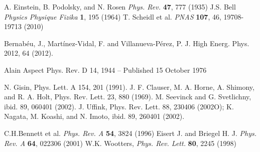 \begin{thebibliography}{}

 A. Einstein, B. Podolsky, and N. Rosen \textit{Phys. Rev.} \textbf{47}, 777 (1935)
 J.S. Bell \textit{Physics Physique Fizika} \textbf{1}, 195 (1964)
 T. Scheidl et al. \textit{PNAS} \textbf{107}, 46, 19708-19713 (2010)

 Bernabéu, J., Martínez-Vidal, F. and Villanueva-Pérez, P. J. High Energ. Phys. 2012, 64 (2012).

 Alain Aspect Phys. Rev. D 14, 1944 – Published 15 October 1976

 N. Gisin, Phys. Lett. A 154, 201 (1991).
 J. F. Clauser, M. A. Horne, A. Shimony, and R. A. Holt, Phys. Rev. Lett. 23, 880 (1969).
 M. Seevinck and G. Svetlichny, ibid. 89, 060401 (2002).
  J. Uffink, Phys. Rev. Lett. 88, 230406 (2002O); K. Nagata, M. Koashi, and N. Imoto, ibid. 89, 260401 (2002).
%

 C.H.Bennett et al. \textit{Phys. Rev. A} \textbf{54}, 3824 (1996)
 Eisert J. and Briegel H. J. \textit{Phys. Rev. A} \textbf{64}, 022306 (2001)
 W.K. Wootters, \textit{Phys. Rev. Lett.} \textbf{80}, 2245 (1998)



\end{thebibliography}
